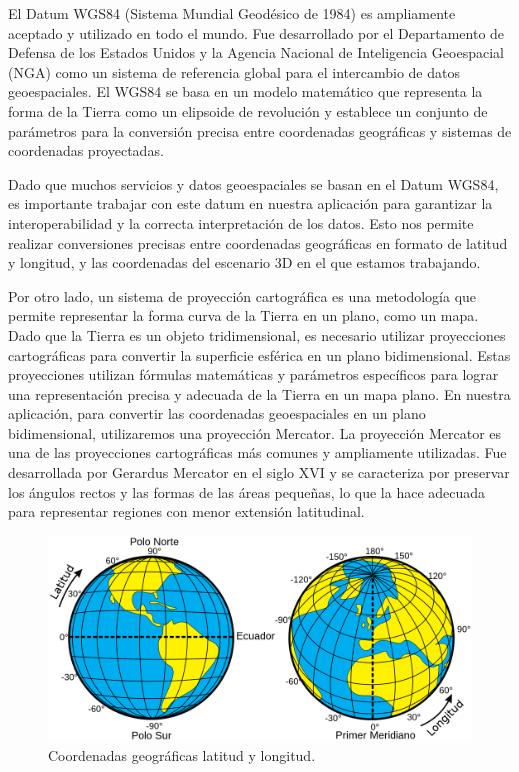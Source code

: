 \documentclass[a4paper, 11pt]{book}
\begin{document}
El Datum WGS84 (Sistema Mundial Geodésico de 1984) es ampliamente aceptado y utilizado en todo el mundo. Fue desarrollado por el Departamento de Defensa de los Estados Unidos y la Agencia Nacional de Inteligencia Geoespacial (NGA) como un sistema de referencia global para el intercambio de datos geoespaciales. El WGS84 se basa en un modelo matemático que representa la forma de la Tierra como un elipsoide de revolución y establece un conjunto de parámetros para la conversión precisa entre coordenadas geográficas y sistemas de coordenadas proyectadas.

Dado que muchos servicios y datos geoespaciales se basan en el Datum WGS84, es importante trabajar con este datum en nuestra aplicación para garantizar la interoperabilidad y la correcta interpretación de los datos. Esto nos permite realizar conversiones precisas entre coordenadas geográficas en formato de latitud y longitud, y las coordenadas del escenario 3D en el que estamos trabajando.

Por otro lado, un sistema de proyección cartográfica es una metodología que permite representar la forma curva de la Tierra en un plano, como un mapa. Dado que la Tierra es un objeto tridimensional, es necesario utilizar proyecciones cartográficas para convertir la superficie esférica en un plano bidimensional. Estas proyecciones utilizan fórmulas matemáticas y parámetros específicos para lograr una representación precisa y adecuada de la Tierra en un mapa plano.
En nuestra aplicación, para convertir las coordenadas geoespaciales en un plano bidimensional, utilizaremos una proyección Mercator. La proyección Mercator es una de las proyecciones cartográficas más comunes y ampliamente utilizadas. Fue desarrollada por Gerardus Mercator en el siglo XVI y se caracteriza por preservar los ángulos rectos y las formas de las áreas pequeñas, lo que la hace adecuada para representar regiones con menor extensión latitudinal.
\begin{figure}[H]
  \centering
  \includegraphics[width=12cm, keepaspectratio]{img/Latitud_y_Longitud_en_la_Tierra.svg.png}
  \caption{Coordenadas geográficas latitud y longitud.}
  \label{fig:latlong}
\end{figure}
\end{document}
